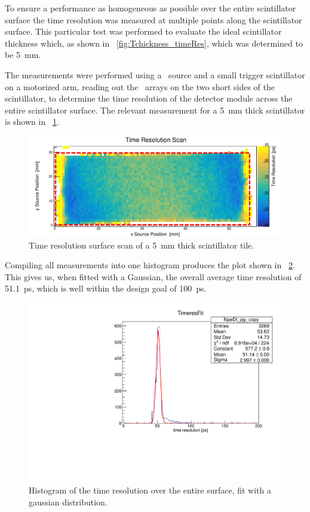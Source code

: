 \documentclass[../BTOF_summary.tex]{subfiles}
\begin{document}
To ensure a performance as homogeneous as possible over the entire scintillator surface the time resolution was measured at multiple points along the scintillator surface.
This particular test was performed to evaluate the ideal scintillator thickness which, as shown in \fig~\ref{fig:Tchickness_timeRes}, which was determined to be \SI{5}{mm}.

The measurements were performed using a \sr\ source and a small trigger scintillator on a motorized arm, reading out the \sipm\ arrays on the two short sides of the scintillator, to determine the time resolution of the detector module across the entire scintillator surface.
The relevant measurement for a \SI{5}{mm} thick scintillator is shown in \fig~\ref{fig:Time_res_scan_erlangen}.

\begin{figure}[htbp]
    \centering
    \includegraphics*[width=.9\textwidth]{fig/TimeResolution_5mm.pdf}
    \caption{Time resolution surface scan of a \SI{5}{mm} thick scintillator tile.}
    \label{fig:Time_res_scan_erlangen}
\end{figure}

Compiling all measurements into one histogram produces the plot shown in \fig~\ref{fig:timeRes_scan_fit}.
This gives us, when fitted with a Gaussian, the overall average time resolution of \SI{51.1}{ps}, which is well within the design goal of \SI{100}{ps}.

\begin{figure}[htbp]
    \centering
    \includegraphics*[width=.7\textwidth]{fig/run52_widthfit.pdf}
    \caption{Histogram of the time resolution over the entire surface, fit with a gaussian distribution.}
    \label{fig:timeRes_scan_fit}
\end{figure}
\end{document}

